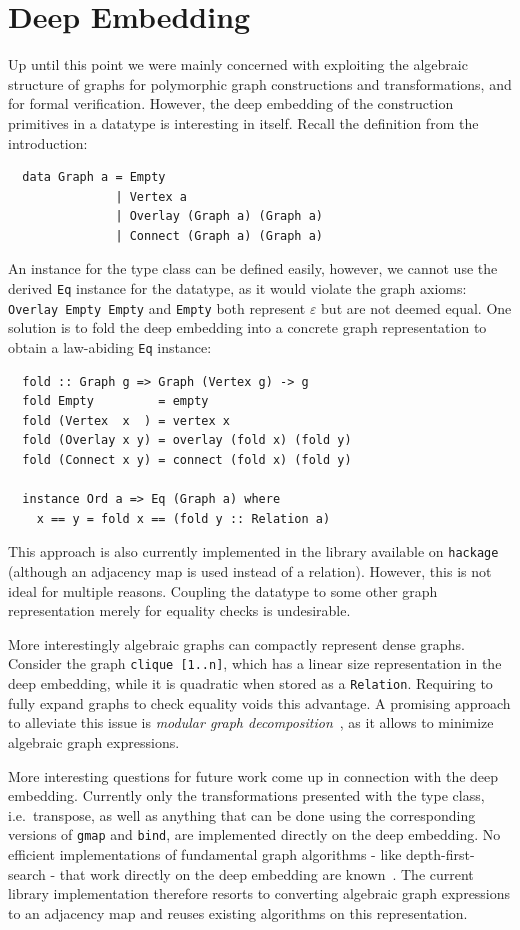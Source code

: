 \documentclass{article}
\newcommand{\hs}{\texttt}
\renewcommand{\epsilon}{\varepsilon}
\newcommand{\eps}{\epsilon}
\begin{document}
\section{Deep Embedding}\label{sec:deep}
Up until this point we were mainly concerned with exploiting the algebraic
structure of graphs for polymorphic graph constructions and transformations, and
for formal verification. However, the deep embedding of the
construction primitives in a datatype is interesting in itself. Recall the
definition from the introduction:
\begin{verbatim}
  data Graph a = Empty
               | Vertex a
               | Overlay (Graph a) (Graph a)
               | Connect (Graph a) (Graph a)
\end{verbatim}
An instance for the type class can be defined easily, however, we cannot use the
derived \hs{Eq} instance for the datatype, as it would violate the graph axioms:
\hs{Overlay Empty Empty} and \hs{Empty} both represent $\eps$ but are not deemed
equal.
One solution is to fold the deep embedding into a concrete graph representation to
obtain a law-abiding \hs{Eq} instance:
\begin{verbatim}
  fold :: Graph g => Graph (Vertex g) -> g
  fold Empty         = empty
  fold (Vertex  x  ) = vertex x
  fold (Overlay x y) = overlay (fold x) (fold y)
  fold (Connect x y) = connect (fold x) (fold y)

  instance Ord a => Eq (Graph a) where
    x == y = fold x == (fold y :: Relation a)
\end{verbatim}
This approach is also currently implemented in the library available on
\texttt{hackage} (although an adjacency map is used instead of a relation).
However, this is not ideal for multiple reasons. Coupling the datatype to some
other graph representation merely for equality checks is undesirable.

More interestingly algebraic graphs can compactly represent dense graphs.
Consider the graph \hs{clique [1..n]}, which has a linear size representation in
the deep embedding, while it is quadratic when stored as a \hs{Relation}.
Requiring to fully expand graphs to check equality voids this advantage. A
promising approach to alleviate this issue is \textit{modular graph
  decomposition}~\cite{mcconnell2005linear}, as it allows to minimize algebraic
graph expressions.

More interesting questions for future work come up in connection with the deep
embedding. Currently only the transformations presented with the type class, i.e.\
transpose, as well as anything that can be done using the corresponding versions
of \hs{gmap} and \hs{bind}, are implemented directly on the deep embedding. No
efficient implementations of fundamental graph algorithms - like
depth-first-search - that work directly on the deep embedding are
known~\cite{mokhov2017algebraic}. The current library implementation therefore
resorts to converting algebraic graph expressions to an adjacency map and reuses
existing algorithms on this representation.
\end{document}
